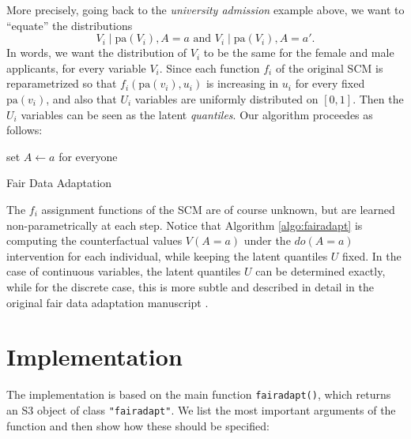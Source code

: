 \documentclass[
  notitle]{jss}
\begin{document}
More precisely, going back to the \emph{university admission} example
above, we want to ``equate'' the distributions \begin{equation}
  V_i \mid \mathrm{pa}(V_i), A = a \text{ and } V_i \mid \mathrm{pa}(V_i), A = a'.
\end{equation} In words, we want the distribution of \(V_i\) to be the
same for the female and male applicants, for every variable \(V_i\).
Since each function \(f_i\) of the original SCM is reparametrized so
that \(f_i(\mathrm{pa}(v_i), u_i)\) is increasing in \(u_i\) for every
fixed \(\mathrm{pa}(v_i)\), and also that \(U_i\) variables are
uniformly distributed on \([0, 1]\). Then the \(U_i\) variables can be
seen as the latent \textit{quantiles}. Our algorithm proceedes as
follows:

\begin{algorithm}
    \DontPrintSemicolon
    set $A \gets a$ for everyone\\
    \caption{{\sc Fair Data Adaptation}}
    \label{algo:fairadapt}
\end{algorithm}

The \(f_i\) assignment functions of the SCM are of course unknown, but
are learned non-parametrically at each step. Notice that Algorithm
\ref{algo:fairadapt} is computing the counterfactual values \(V(A = a)\)
under the \(do(A = a)\) intervention for each individual, while keeping
the latent quantiles \(U\) fixed. In the case of continuous variables,
the latent quantiles \(U\) can be determined exactly, while for the
discrete case, this is more subtle and described in detail in the
original fair data adaptation manuscript
\citep[Section~5]{plecko2020fair}.

\hypertarget{implementation}{%
\section{Implementation}\label{implementation}}

\label{Implementation}

The implementation is based on the main function \texttt{fairadapt()},
which returns an S3 object of class \texttt{"fairadapt"}. We list the
most important arguments of the function and then show how these should
be specified:
\end{document}
